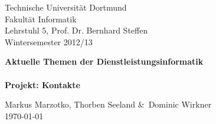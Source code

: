 \begin{titlepage}
\begin{small}
\vfill {Technische Universit\"at Dortmund\\ 
Fakult\"at Informatik \\
Lehrstuhl 5, Prof. Dr. Bernhard Steffen \\
Wintersemester 2012/13}
\end{small}


\begin{center}
\begin{Large}
\vfill {\textsf{\textbf{
Aktuelle Themen der Dienstleistungsinformatik\\\ \\
Projekt: Kontakte
}}}
\end{Large}
\end{center}

\begin{small}
\vfill Markus Marzotko, Thorben Seeland \&\ Dominic Wirkner\\ 
\today
\end{small}

\end{titlepage}
